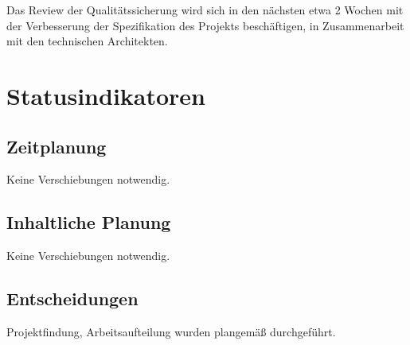 Das Review der Qualitätssicherung wird sich in den nächsten etwa 2 Wochen mit 
der Verbesserung der Spezifikation des Projekts beschäftigen, in Zusammenarbeit 
mit den technischen Architekten.

\section{Statusindikatoren}

\subsection{Zeitplanung}
Keine Verschiebungen notwendig.

\subsection{Inhaltliche Planung}
Keine Verschiebungen notwendig.

\subsection{Entscheidungen}
Projektfindung, Arbeitsaufteilung wurden plangemäß durchgeführt.



